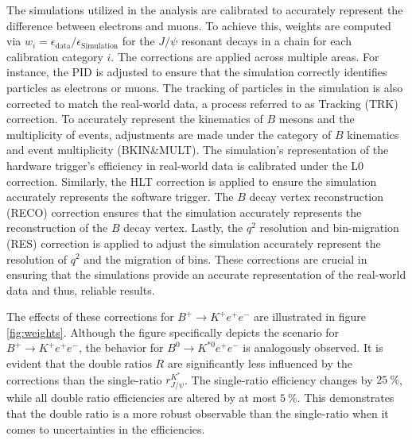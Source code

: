 The simulations utilized in the analysis are calibrated to accurately represent the difference 
between electrons and muons. To achieve this, weights are computed via 
$w_i=\epsilon_\text{data}/\epsilon_\text{Simulation}$ for the $J\!/\!\psi$ resonant decays in a chain 
for each calibration category $i$. 
The corrections are applied across multiple areas. For instance, the PID is adjusted to ensure 
that the simulation correctly identifies particles as electrons or muons. The tracking of 
particles in the simulation is also corrected to match the real-world data, a process referred 
to as Tracking (TRK) correction.
To accurately represent the kinematics of $B$ mesons and the multiplicity of events, adjustments 
are made under the category of $B$ kinematics and event multiplicity (BKIN\&MULT). The simulation's
representation of the hardware trigger's efficiency in real-world data is calibrated under the 
L0 correction.
Similarly, the HLT correction is applied to ensure the simulation accurately represents the software 
trigger. The $B$ decay vertex reconstruction (RECO) correction ensures that the simulation accurately 
represents the reconstruction of the $B$ decay vertex.
Lastly, the $q^2$ resolution and bin-migration (RES) correction is applied to adjust the simulation 
accurately represent the resolution of $q^2$ and the migration of bins. These corrections are crucial 
in ensuring that the simulations provide an accurate representation of the real-world data and thus, 
reliable results.

The effects of these corrections for $B^+\to K^+e^+e^-$ are illustrated in figure \ref{fig:weights}. 
Although the figure specifically depicts the scenario for $B^+\to K^+e^+e^-$, the behavior for 
$B^0\to K^{*0}e^+e^-$ is analogously observed. It is evident that the double ratios $R$ are 
significantly less influenced by the corrections than the single-ratio $r^{K^*}_{J\!/\!\psi}$. 
The single-ratio efficiency changes by $\SI{25}{\%}$, while all double ratio efficiencies are 
altered by at most $\SI{5}{\%}$. This demonstrates that the double ratio is a more robust observable 
than the single-ratio when it comes to uncertainties in the efficiencies.

